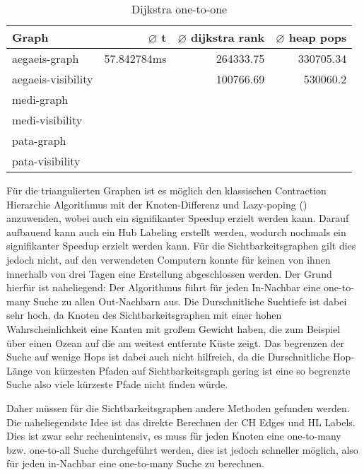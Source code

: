 \begin{table}[h]
    \centering
    \begin{tabular}{lrrr}
        \toprule
        Graph              & $\varnothing$ t & $\varnothing$ dijkstra rank & $\varnothing$ heap pops \\ \midrule
        aegaeis-graph      & 57.842784ms     & 264333.75                   & 330705.34               \\
        aegaeis-visibility &                 & 100766.69                   & 530060.2                \\
        medi-graph         &                 &                             &                         \\
        medi-visibility    &                 &                             &                         \\
        pata-graph         &                 &                             &                         \\
        pata-visibility    &                 &                             &                         \\ \bottomrule
    \end{tabular}
    \caption{Dijkstra one-to-one}
    \label{table:dijkstra_one_to_one}
\end{table}

Für die triangulierten Graphen ist es möglich den klassischen Contraction Hierarchie Algorithmus mit der Knoten-Differenz und Lazy-poping (\cite{geisberger2008contraction}) anzuwenden, wobei auch ein signifikanter Speedup erzielt werden kann. 
Darauf aufbauend kann auch ein Hub Labeling erstellt werden, wodurch nochmals ein signifikanter Speedup erzielt werden kann.
Für die Sichtbarkeitsgraphen gilt dies jedoch nicht, auf den verwendeten Computern konnte für keinen von ihnen innerhalb von drei Tagen eine Erstellung abgeschlossen werden. 
Der Grund hierfür ist naheliegend: Der Algorithmus führt für jeden In-Nachbar eine one-to-many Suche zu allen Out-Nachbarn aus.
Die Durschnitliche Suchtiefe ist dabei sehr hoch, da Knoten des Sichtbarkeitsgraphen mit einer hohen Wahrscheinlichkeit eine Kanten mit großem Gewicht haben, die zum Beispiel über einen Ozean auf die am weitest entfernte Küste zeigt.
Das begrenzen der Suche auf wenige Hops ist dabei auch nicht hilfreich, da die Durschnitliche Hop-Länge von kürzesten Pfaden auf Sichtbarkeitsgraph gering ist eine so begrenzte Suche also viele kürzeste Pfade nicht finden würde.

Daher müssen für die Sichtbarkeitsgraphen andere Methoden gefunden werden.
Die naheliegendste Idee ist das direkte Berechnen der CH Edges und HL Labels.
Dies ist zwar sehr rechenintensiv, es muss für jeden Knoten eine one-to-many bzw. one-to-all Suche durchgeführt werden, dies ist jedoch schneller möglich, also für jeden in-Nachbar eine one-to-many Suche zu berechnen.



